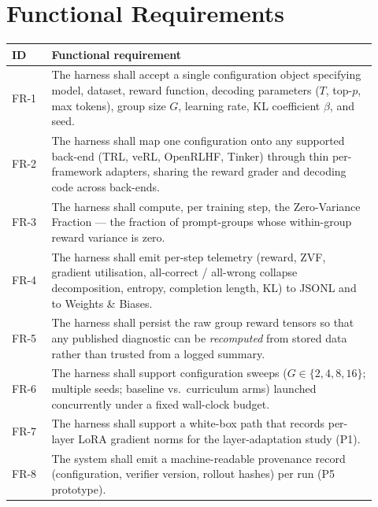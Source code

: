 \section{Functional Requirements}
\begin{longtable}{@{}L{0.10\linewidth}L{0.82\linewidth}@{}}
\toprule
\textbf{ID} & \textbf{Functional requirement} \\
\midrule
\endhead
FR-1 & The harness shall accept a single configuration object specifying model,
dataset, reward function, decoding parameters ($T$, top-$p$, max tokens), group
size $G$, learning rate, KL coefficient $\beta$, and seed. \\
FR-2 & The harness shall map one configuration onto any supported back-end (TRL,
veRL, OpenRLHF, Tinker) through thin per-framework adapters, sharing the reward
grader and decoding code across back-ends. \\
FR-3 & The harness shall compute, per training step, the Zero-Variance Fraction ---
the fraction of prompt-groups whose within-group reward variance is zero. \\
FR-4 & The harness shall emit per-step telemetry (reward, ZVF, gradient
utilisation, all-correct / all-wrong collapse decomposition, entropy, completion
length, KL) to JSONL and to Weights \& Biases. \\
FR-5 & The harness shall persist the raw group reward tensors so that any published
diagnostic can be \emph{recomputed} from stored data rather than trusted from a
logged summary. \\
FR-6 & The harness shall support configuration sweeps ($G\in\{2,4,8,16\}$; multiple
seeds; baseline vs.\ curriculum arms) launched concurrently under a fixed
wall-clock budget. \\
FR-7 & The harness shall support a white-box path that records per-layer LoRA
gradient norms for the layer-adaptation study (P1). \\
FR-8 & The system shall emit a machine-readable provenance record (configuration,
verifier version, rollout hashes) per run (P5 prototype). \\
\bottomrule
\end{longtable}

